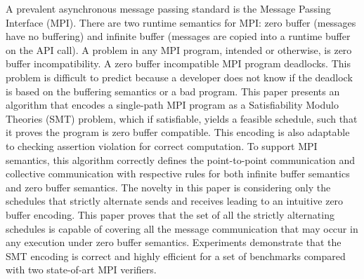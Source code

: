 %
A prevalent asynchronous message passing standard is the Message Passing Interface (MPI). 
%
There are two runtime semantics for MPI: zero buffer (messages have no buffering) and infinite buffer (messages are copied into a runtime buffer on the API call).
%
A problem in any MPI program, intended or otherwise, is zero buffer incompatibility. A zero buffer incompatible MPI program deadlocks.
%
This problem is difficult to predict because a developer does not know if the deadlock is based on the buffering semantics or a bad program. 
%
This paper presents an algorithm that encodes a single-path MPI program as a Satisfiability Modulo Theories (SMT) problem, which if satisfiable, yields a feasible schedule, such that it proves the program is zero buffer compatible. This encoding is also adaptable to checking assertion violation for correct computation.
%
To support MPI semantics, this algorithm correctly defines the point-to-point communication and collective communication with respective rules for both infinite buffer semantics and zero buffer semantics. 
%
The novelty in this paper is considering only the schedules that strictly alternate sends and receives leading to an intuitive zero buffer encoding.
%
This paper proves that the set of all the strictly alternating schedules is capable of covering all the message communication that may occur in any execution under zero buffer semantics. 
%
%
%
%
%
%
%
%
Experiments demonstrate that the SMT encoding is correct and highly efficient for a set of benchmarks compared with two state-of-art MPI verifiers. 
%
